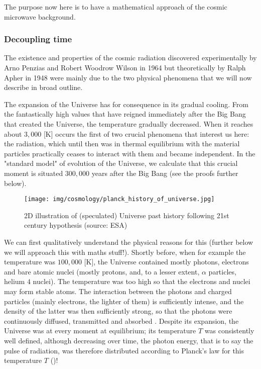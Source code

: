 	The purpose now here is to have a mathematical approach of the  cosmic microwave background.
	
	\subsubsection{Decoupling time}\label{decoupling time}
	The existence and properties of the cosmic radiation discovered experimentally by Arno Penzias and Robert Woodrow Wilson in 1964 but theoretically by Ralph Apher  in 1948 were mainly due to the two physical phenomena that we will now describe in broad outline.

	The expansion of the Universe has for consequence in its gradual cooling. From the fantastically high values that have reigned immediately after the Big Bang that created the Universe, the temperature gradually decreased. When it reaches about $3,000$ [K] occurs the first of two crucial phenomena that interest us here: the radiation, which until then was in thermal equilibrium with the material particles practically ceases to interact with them and became independent. In the "standard model" of evolution of the Universe, we calculate that this crucial moment is situated $300,000$ years after the Big Bang (see the proofs further below).
	\begin{figure}[H]
		\centering
		\texttt{[image: img/cosmology/planck\_history\_of\_universe.jpg]}
		\caption[2D illustration of (speculated) Universe past history following 21st century hypothesis]{2D illustration of (speculated) Universe past history following 21st century hypothesis (source: ESA)}
	\end{figure}
	We can first qualitatively understand the physical reasons for this (further below we will approach this with maths stuff!). Shortly before, when for example the temperature was $100,000$ [K], the Universe contained mostly photons, electrons and bare atomic nuclei (mostly protons, and, to a lesser extent, $\alpha$ particles, helium $4$ nuclei). The temperature was too high so that the electrons and nuclei may form stable atoms. The interaction between the photons and charged particles (mainly electrons, the lighter of them) is sufficiently intense, and the density of the latter was then sufficiently strong, so that the photons were continuously diffused, transmitted and absorbed . Despite its expansion, the Universe was at every moment at equilibrium; its temperature $T$ was consistently well defined, although decreasing over time, the photon energy, that is to say the pulse of radiation, was therefore distributed according to Planck's law for this temperature $T$ ()!
	
